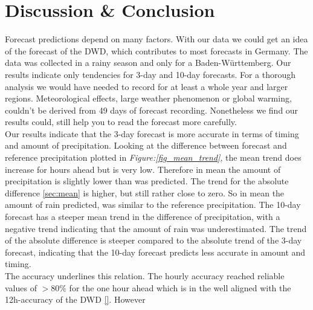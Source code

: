 \documentclass{article}
\theoremstyle{plain}
\theoremstyle{definition}
\theoremstyle{remark}
\begin{document}
\section{Discussion \& Conclusion}\label{sec:conclusion}
Forecast predictions depend on many factors. With our data we could get an idea
of the forecast of the DWD, which contributes to most forecasts in Germany.
The data was collected in a rainy season and only for a Baden-Württemberg.
Our results indicate only tendencies for 3-day and 10-day forecasts. For a
thorough analysis we would have needed to record for at least a whole year and
larger regions. Meteorological effects, large weather phenomenon or global
warming, couldn't be derived from 49 days of forecast recording.
Nonetheless we find our results could, still help you to read the forecast more
carefully.\\ %
Our results indicate that the 3-day forecast is more accurate in terms of
timing and amount of precipitation.  %
Looking at the difference between forecast and reference precipitation plotted
in \textit{Figure:\ref{fig_mean_trend}}, the mean trend does increase for hours
ahead but is very low.	%
Therefore in mean the amount of precipitation is slightly lower than was
predicted. The trend for the absolute difference \ref{sec:mean} is higher, but
still rather close to zero. %
So in mean the amount of rain predicted, was %
similar to the reference precipitation. The 10-day forecast has a steeper mean
trend in the difference of precipitation, with a negative trend indicating that
the amount of rain was underestimated. The trend of the absolute difference is
steeper compared to the absolute trend of the 3-day forecast, indicating that
the 10-day forecast predicts less accurate in amount and timing. \\
The accuracy underlines this relation.
The hourly accuracy reached reliable values of $>80\%$ for the one hour ahead
which is in the well aligned with the 12h-accuracy of the DWD \ref{}. However
\end{document}
